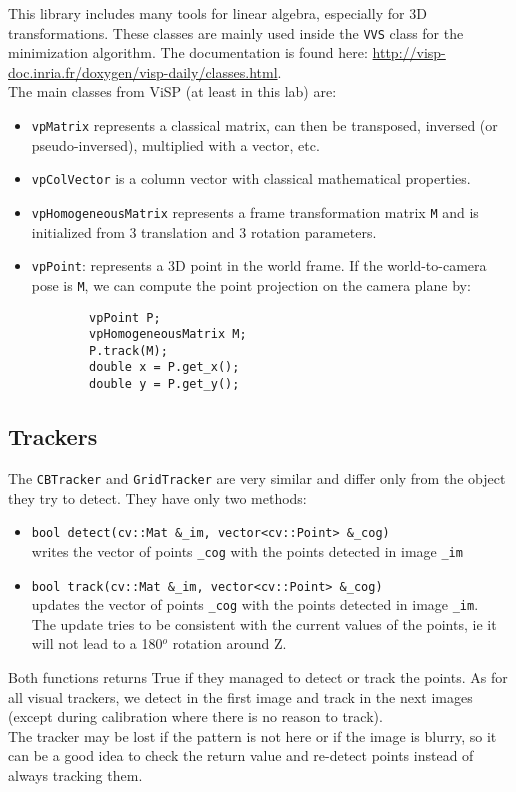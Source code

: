 \documentclass{ecnreport}
\begin{document}
This library includes many tools for linear algebra, especially for 3D transformations. These classes are mainly used inside the \texttt{VVS} class for the minimization algorithm.
The documentation is found here: \url{http://visp-doc.inria.fr/doxygen/visp-daily/classes.html}.\\
The main classes from ViSP (at least in this lab) are:
\begin{itemize}
\item \texttt{vpMatrix} represents a classical matrix, can then be transposed, inversed (or pseudo-inversed), multiplied with a vector, etc.
\item \texttt{vpColVector} is a column vector with classical mathematical properties.
\item \texttt{vpHomogeneousMatrix} represents a frame transformation matrix \texttt{M} and is initialized from 3 translation and 3 rotation parameters.
\item \texttt{vpPoint}: represents a 3D point in the world frame. If the world-to-camera pose is \texttt{M}, we can compute the point projection on the camera plane by:
\begin{center}\cppstyle
\begin{lstlisting}
        vpPoint P;
        vpHomogeneousMatrix M;
        P.track(M);
        double x = P.get_x();
        double y = P.get_y();
\end{lstlisting}
\end{center}
\end{itemize}


\subsection{Trackers}

The \texttt{CBTracker} and \texttt{GridTracker} are very similar and differ only from the object they try to detect. They have only two methods:
\begin{itemize}
    \item \texttt{bool detect(cv::Mat \&\_im, vector<cv::Point> \&\_cog)} \\ writes the vector of points \texttt{\_cog} with the points detected in image \texttt{\_im}
    \item \texttt{bool track(cv::Mat \&\_im, vector<cv::Point> \&\_cog)} \\ updates the vector of points \texttt{\_cog} with the points detected in image \texttt{\_im}.\\The update tries to 
    be consistent with the current values of the points, ie it will not lead to a 180${}^o$ rotation around Z.
\end{itemize}Both functions returns True if they managed to detect or track the points.
As for all visual trackers, we detect in the first image and track in the next images (except during calibration where there is no reason to track).\\
The tracker may be lost if the pattern is not here or if the image is blurry, so it can be a good idea to check the return value and re-detect points instead of always tracking them.
\end{document}
